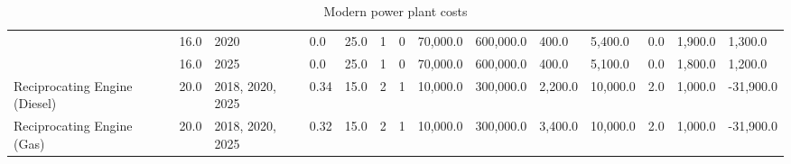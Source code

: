 \begin{table*}[]
\begin{tabularx}{\linewidth}{|p{}|l|x|l|l|l|l|l|l|l|l|l|l|l|}
& 16.0 & 2020 & 0.0 & 25.0 & 1 & 0 & 70,000.0 & 600,000.0 & 400.0 & 5,400.0 & 0.0 & 1,900.0 & 1,300.0 \\  
& 16.0 & 2025 & 0.0 & 25.0 & 1 & 0 & 70,000.0 & 600,000.0 & 400.0 & 5,100.0 & 0.0 & 1,800.0 & 1,200.0 \\ \hline
Reciprocating Engine (Diesel) & 20.0 & 2018, 2020, 2025 & 0.34 & 15.0 & 2 & 1 & 10,000.0 & 300,000.0 & 2,200.0 & 10,000.0 & 2.0 & 1,000.0 & -31,900.0 \\ \hline
Reciprocating Engine (Gas) & 20.0 & 2018, 2020, 2025 & 0.32 & 15.0 & 2 & 1 & 10,000.0 & 300,000.0 & 3,400.0 & 10,000.0 & 2.0 & 1,000.0 & -31,900.0 \\ \hline

	\end{tabularx}
		\caption{Modern power plant costs \cite{Department2016}}
		\label{table:modern_plant_costs}
\end{table*}


